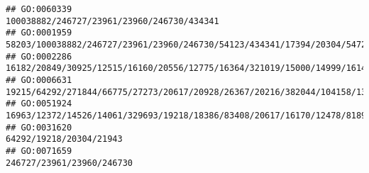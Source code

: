\documentclass[
]{article}
\begin{document}
\begin{verbatim}
## GO:0060339                                                                                                                                                                                                                                                                                                                                                                   100038882/246727/23961/23960/246730/434341
## GO:0001959                                                                                                                                                                                                                                                                                                                  58203/100038882/246727/23961/23960/246730/54123/434341/17394/20304/547253/19876/15511/16149
## GO:0002286                                                                                                                                                                                                                                                                                                                               16182/20849/30925/12515/16160/20556/12775/16364/321019/15000/14999/16149/20371
## GO:0006631                                                                                                                                                                                                                           19215/64292/271844/66775/27273/20617/20928/26367/20216/382044/104158/13897/102022/234671/234673/71903/11808/66113/105387/13101/13105/380997/223706/631304/13078/16149/72082/433247
## GO:0051924                                                                                                                                                                                                                                                                                    16963/12372/14526/14061/329693/19218/18386/83408/20617/16170/12478/81897/246788/20304/14169/22337/24115/12482/14126/12766
## GO:0031620                                                                                                                                                                                                                                                                                                                                                                                      64292/19218/20304/21943
## GO:0071659                                                                                                                                                                                                                                                                                                                                                                                    246727/23961/23960/246730

\end{verbatim}
\end{document}
